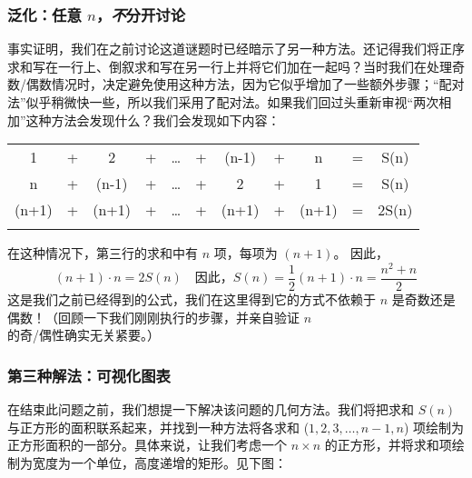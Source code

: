 \subsubsection*{泛化：任意 $n$，\textit{不}分开讨论}

事实证明，我们在之前讨论这道谜题时已经暗示了另一种方法。还记得我们将正序求和写在一行上、倒叙求和写在另一行上并将它们加在一起吗？当时我们在处理奇数/偶数情况时，决定避免使用这种方法，因为它似乎增加了一些额外步骤；“配对法”似乎稍微快一些，所以我们采用了配对法。如果我们回过头重新审视“两次相加”这种方法会发现什么？我们会发现如下内容：

\begin{center}
    \begin{tabular}{ccccccccccc}
           1  & + &     2 & + & \dots & + & (n-1) & + &     n & = & S(n)\\\noalign{\smallskip\smallskip}
           n  & + & (n-1) & + & \dots & + &     2 & + &     1 & = & S(n)\\\noalign{\smallskip\smallskip}
        \hline
        (n+1) & + & (n+1) & + & \dots & + & (n+1) & + & (n+1) & = & 2S(n)\\\noalign{\smallskip\smallskip}
    \end{tabular}
\end{center}
在这种情况下，第三行的求和中有 $n$ 项，每项为 $(n + 1)$。 因此，
\[(n+1) \cdot n = 2S(n) \quad \text{因此，} S(n) = \frac{1}{2}(n+1) \cdot n = \frac{n^2+n}{2}\]
这是我们之前已经得到的公式，我们在这里得到它的方式不依赖于 $n$ 是奇数还是偶数！（回顾一下我们刚刚执行的步骤，并亲自验证 $n$ 的奇/偶性确实无关紧要。）

\subsubsection*{第三种解法：可视化图表}

在结束此问题之前，我们想提一下解决该问题的几何方法。我们将把求和 $S(n)$ 与正方形的面积联系起来，并找到一种方法将各求和 ($1, 2, 3, \dots, n - 1, n$) 项绘制为正方形面积的一部分。具体来说，让我们考虑一个 $n \times n$ 的正方形，并将求和项绘制为宽度为一个单位，高度递增的矩形。见下图：

\begin{center}
\end{center}

